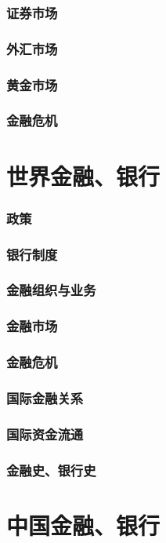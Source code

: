 \documentclass[UTF8]{../../RepresentationUniverse}
\begin{document}
        \subsubsection{证券市场}
        \subsubsection{外汇市场}
        \subsubsection{黄金市场}
        \subsubsection{金融危机}

\section{世界金融、银行}
    \subsubsection{政策}
    \subsubsection{银行制度}
    \subsubsection{金融组织与业务}
    \subsubsection{金融市场}
    \subsubsection{金融危机}
    \subsubsection{国际金融关系}
    \subsubsection{国际资金流通}
    \subsubsection{金融史、银行史}

\section{中国金融、银行}
\end{document}
